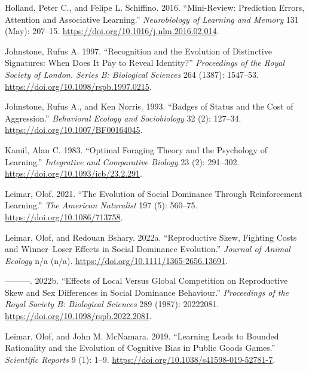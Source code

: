 \documentclass[
  12pt,
]{article}
\newlength{\cslhangindent}
\newlength{\cslentryspacingunit} %
\newenvironment{CSLReferences}[2] %
 {%
  \setlength{\parindent}{0pt}
  \ifodd #1
  \let\oldpar\par
  \def\par{\hangindent=\cslhangindent\oldpar}
  \fi
  \setlength{\parskip}{#2\cslentryspacingunit}
 }%
 {}
\begin{document}
\begin{CSLReferences}{1}{0}
\leavevmode{}%
Holland, Peter C., and Felipe L. Schiffino. 2016. {``Mini-Review:
{Prediction} Errors, Attention and Associative Learning.''}
\emph{Neurobiology of Learning and Memory} 131 (May): 207--15.
\url{https://doi.org/10.1016/j.nlm.2016.02.014}.

\leavevmode{}%
Johnstone, Rufus A. 1997. {``Recognition and the Evolution of
Distinctive Signatures: When Does It Pay to Reveal Identity?''}
\emph{Proceedings of the Royal Society of London. Series B: Biological
Sciences} 264 (1387): 1547--53.
\url{https://doi.org/10.1098/rspb.1997.0215}.

\leavevmode{}%
Johnstone, Rufus A., and Ken Norris. 1993. {``Badges of Status and the
Cost of Aggression.''} \emph{Behavioral Ecology and Sociobiology} 32
(2): 127--34. \url{https://doi.org/10.1007/BF00164045}.

\leavevmode{}%
Kamil, Alan C. 1983. {``Optimal {Foraging} {Theory} and the {Psychology}
of {Learning}.''} \emph{Integrative and Comparative Biology} 23 (2):
291--302. \url{https://doi.org/10.1093/icb/23.2.291}.

\leavevmode{}%
Leimar, Olof. 2021. {``The {Evolution} of {Social} {Dominance} Through
{Reinforcement} {Learning}.''} \emph{The American Naturalist} 197 (5):
560--75. \url{https://doi.org/10.1086/713758}.

\leavevmode{}%
Leimar, Olof, and Redouan Bshary. 2022a. {``Reproductive Skew, Fighting
Costs and Winner--Loser Effects in Social Dominance Evolution.''}
\emph{Journal of Animal Ecology} n/a (n/a).
\url{https://doi.org/10.1111/1365-2656.13691}.

\leavevmode{}%
---------. 2022b. {``Effects of Local Versus Global Competition on
Reproductive Skew and Sex Differences in Social Dominance Behaviour.''}
\emph{Proceedings of the Royal Society B: Biological Sciences} 289
(1987): 20222081. \url{https://doi.org/10.1098/rspb.2022.2081}.

\leavevmode{}%
Leimar, Olof, and John M. McNamara. 2019. {``Learning Leads to Bounded
Rationality and the Evolution of Cognitive Bias in Public Goods
Games.''} \emph{Scientific Reports} 9 (1): 1--9.
\url{https://doi.org/10.1038/s41598-019-52781-7}.


\end{CSLReferences}
\end{document}
